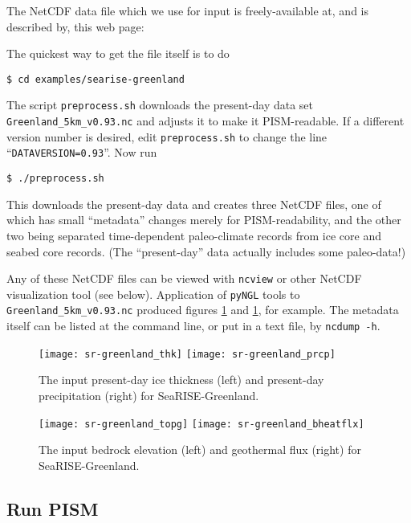 The NetCDF data file which we use for input is freely-available at, and is described by, this web page: 
\medskip

\centerline{}
\medskip

\noindent The quickest way to get the file itself is to do

\verb|$ cd examples/searise-greenland|

\noindent The script \verb|preprocess.sh| downloads the present-day data set  \verb|Greenland_5km_v0.93.nc| and adjusts it to make it PISM-readable.  If a different version number is desired, edit \verb|preprocess.sh| to change the line ``\verb|DATAVERSION=0.93|''.  Now run

\verb|$ ./preprocess.sh|

\noindent This downloads the present-day data and creates three NetCDF files, one of which has small ``metadata'' changes merely for PISM-readability, and the other two being separated time-dependent paleo-climate records from ice core and seabed core records.  (The ``present-day'' data actually includes some paleo-data!)

Any of these NetCDF files can be viewed with \verb|ncview| or other NetCDF visualization tool (see below).  Application of \verb|pyNGL| tools to \verb|Greenland_5km_v0.93.nc| produced figures \ref{fig:sr-input1} and  \ref{fig:sr-input1}, for example.  The metadata itself can be listed at the command line, or put in a text file, by \verb|ncdump -h|.

\begin{figure}[ht]
\texttt{[image: sr-greenland\_thk]}
 \quad\texttt{[image: sr-greenland\_prcp]}
\caption{The input present-day ice thickness (left) and present-day precipitation (right) for SeaRISE-Greenland.}
\label{fig:sr-input1}
\end{figure}

\begin{figure}[ht]
\texttt{[image: sr-greenland\_topg]}
 \quad \texttt{[image: sr-greenland\_bheatflx]}\caption{The input bedrock elevation (left) and geothermal flux (right) for SeaRISE-Greenland.}
\label{fig:sr-input2}
\end{figure}


\subsection{Run PISM}

